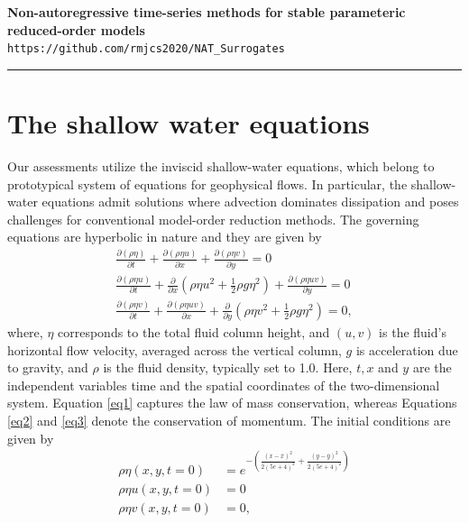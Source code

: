 \documentclass[12pt]{article}
\newcommand{\soptitle}{Non-autoregressive time-series methods for stable parameteric reduced-order models}
\newcommand{\yourname}{\texttt{https://github.com/rmjcs2020/NAT\_Surrogates}}
\begin{document}
\begin{center}
\large
\textbf{
\soptitle} \\
\normalsize
\yourname
\end{center}

\hrule

\bigskip

\section{The shallow water equations}

Our assessments utilize the inviscid shallow-water equations, which belong to prototypical system of equations for geophysical flows. In particular, the shallow-water equations admit solutions where advection dominates dissipation and poses challenges for conventional model-order reduction methods. The governing equations are hyperbolic in nature and they are given by
\begin{align}
    \frac{\partial(\rho \eta)}{\partial t}+\frac{\partial(\rho \eta u)}{\partial x}+\frac{\partial(\rho \eta v)}{\partial y} =0  \label{eq1} \\
    \frac{\partial(\rho \eta u)}{\partial t}+\frac{\partial}{\partial x}\left(\rho \eta u^{2}+\frac{1}{2} \rho g \eta^{2}\right)+\frac{\partial(\rho \eta u v)}{\partial y} = 0 \label{eq2} \\
    \frac{\partial(\rho \eta v)}{\partial t}+\frac{\partial(\rho \eta u v)}{\partial x}+\frac{\partial}{\partial y}\left(\rho \eta v^{2}+\frac{1}{2} \rho g \eta^{2}\right) = 0, \label{eq3}
\end{align}
where, $\eta$ corresponds to the total fluid column height, and $(u,v)$ is the fluid's horizontal flow velocity, averaged across the vertical column, $g$ is acceleration due to gravity, and $\rho$ is the fluid density, typically set to 1.0. Here, $t,x$ and $y$ are the independent variables time and the spatial coordinates of the two-dimensional system. Equation \ref{eq1} captures the law of mass conservation, whereas Equations \ref{eq2} and \ref{eq3} denote the conservation of momentum. The initial conditions are given by 
\begin{align}
    \rho \eta (x,y,t=0) &= e^{-\left(\frac{(x-\bar{x})^2}{2(5e+4)^2} + \frac{(y-\bar{y})^2}{2(5e+4)^2}\right)} \\
    \rho \eta u(x,y,t=0) &= 0 \\
    \rho \eta v(x,y,t=0) &= 0,
\end{align}
\end{document}
